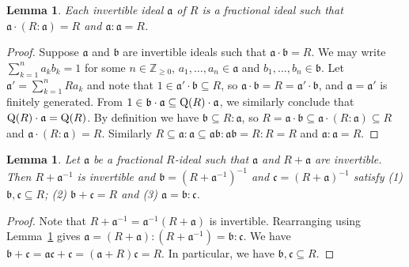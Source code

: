 \documentclass{amsart}
\theoremstyle{plain}
\newtheorem{lemma}[theorem]{Lemma}
\theoremstyle{definition}
\newcommand{\Z}{\ensuremath{\mathbb{Z}}}
\begin{document}
\begin{lemma}\label{lem:inv_basic}
Each invertible ideal \(\mathfrak{a}\) of \(R\) is a fractional ideal such that \(\mathfrak{a}\cdot(R:\mathfrak{a})=R\) and \(\mathfrak{a}:\mathfrak{a}=R\).
\end{lemma}
\begin{proof}
Suppose \(\mathfrak{a}\) and \(\mathfrak{b}\) are invertible ideals such that \(\mathfrak{a}\cdot \mathfrak{b}=R\).
We may write \(\sum_{k=1}^n a_k b_k=1\) for some \(n\in\Z_{\geq 0}\), \(a_1,\dotsc,a_n\in \mathfrak{a}\) and \(b_1,\dotsc,b_n\in \mathfrak{b}\). Let \(\mathfrak{a}'=\sum_{k=1}^n R a_k\) and note that \(1\in \mathfrak{a}'\cdot \mathfrak{b}\subseteq R\), so \(\mathfrak{a}\cdot \mathfrak{b}=R=\mathfrak{a}'\cdot \mathfrak{b}\), and \(\mathfrak{a}=\mathfrak{a}'\) is finitely generated. 
From \(1\in \mathfrak{b}\cdot \mathfrak{a}\subseteq \textup{Q}(R)\cdot \mathfrak{a}\), we similarly conclude that \(\textup{Q}(R)\cdot \mathfrak{a} = \textup{Q}(R)\). 
By definition we have \(\mathfrak{b}\subseteq R:\mathfrak{a}\), so \(R=\mathfrak{a}\cdot \mathfrak{b}\subseteq \mathfrak{a}\cdot (R:\mathfrak{a})\subseteq R\) and \(\mathfrak{a}\cdot (R:\mathfrak{a})=R\).
Similarly \(R\subseteq \mathfrak{a}:\mathfrak{a} \subseteq \mathfrak{ab}:\mathfrak{ab} = R:R=R\) and \(\mathfrak{a}:\mathfrak{a}=R\).
\end{proof}

\begin{lemma}\label{lem:ideal_as_fraction}
Let \(\mathfrak{a}\) be a fractional \(R\)-ideal such that \(\mathfrak{a}\) and \(R+\mathfrak{a}\) are invertible.
Then \(R+\mathfrak{a}^{-1}\) is invertible and \(\mathfrak{b}=(R+\mathfrak{a}^{-1})^{-1}\) and \(\mathfrak{c}=(R+\mathfrak{a})^{-1}\) satisfy \textup{(1)} \(\mathfrak{b},\mathfrak{c}\subseteq R\); \textup{(2)} \(\mathfrak{b}+\mathfrak{c}=R\) and \textup{(3)} \(\mathfrak{a}=\mathfrak{b}:\mathfrak{c}\).
\end{lemma}
\begin{proof}
Note that \(R+\mathfrak{a}^{-1}=\mathfrak{a}^{-1}(R+\mathfrak{a})\) is invertible.
Rearranging using Lemma~\ref{lem:inv_basic} gives \(\mathfrak{a}=(R+\mathfrak{a}):(R+\mathfrak{a}^{-1})=\mathfrak{b}:\mathfrak{c}\).
We have \(\mathfrak{b}+\mathfrak{c}=\mathfrak{a}\mathfrak{c}+\mathfrak{c}=(\mathfrak{a}+R)\mathfrak{c}=R\).
In particular, we have \(\mathfrak{b},\mathfrak{c}\subseteq R\).
\end{proof}
\end{document}

